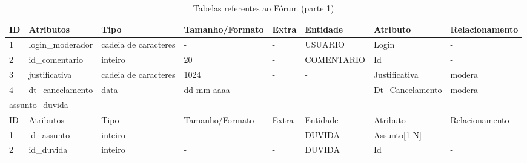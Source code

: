 \documentclass[graduacao,brazil]{ThesisPUC}
\begin{document}
\begin{table}[H]
{\begin{tabular}{|l|l|l|l|l|l|l|l|}
    ID                        & Atributos        & Tipo                 & Tamanho/Formato & Extra            & Entidade        & Atributo         & Relacionamento  \\ \hline
    1                         & login\_moderador & cadeia de caracteres & -               & -                & USUARIO         & Login            & -               \\ \hline
    2                         & id\_comentario   & inteiro              & 20              & -                & COMENTARIO      & Id               & -               \\ \hline
    3                         & justificativa    & cadeia de caracteres & 1024            & -                & -               & Justificativa    & modera          \\ \hline
    4                         & dt\_cancelamento & data                 & dd-mm-aaaa      & -                & -               & Dt\_Cancelamento & modera          \\ \hline
    \multicolumn{8}{|l|}{assunto\_duvida} \\ \hline
    ID                        & Atributos        & Tipo                 & Tamanho/Formato & Extra            & Entidade        & Atributo         & Relacionamento  \\ \hline
    1                         & id\_assunto      & inteiro              & -               & -                & DUVIDA          & Assunto[1-N]     & -               \\ \hline
    2                         & id\_duvida       & inteiro              & -               & -                & DUVIDA          & Id               & -               \\ \hline
    \end{tabular}
    }
    \caption {Tabelas referentes ao F\'{o}rum (parte 1)}
\end{table}
\end{document}
